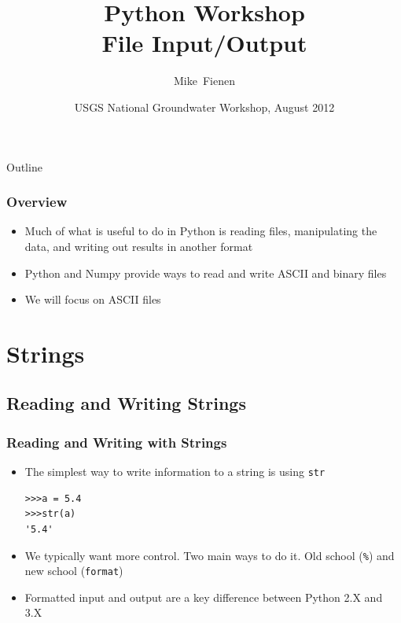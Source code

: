 \documentclass{beamer}
\title[]{Python Workshop\\
File Input/Output}
\author[Fienen] %
{Mike~Fienen}
\institute[USGS] %
{
  U.S. Geological Survey\\
  Wisconsin Water Science Center, Middleton, Wisconsin USA
  }
\date[UQ12] %
{USGS National Groundwater Workshop, August 2012}
\begin{document}
\begin{frame}
  \titlepage
\end{frame}

\begin{frame}{Outline}
\tableofcontents
\end{frame}

\begin{frame}[fragile]
\frametitle{Overview}
\begin{itemize}

\item Much of what is useful to do in Python is reading files, manipulating the data, and writing out results in another format
\item Python and Numpy provide ways to read and write ASCII and binary files
\item We will focus on ASCII files
\end{itemize}
\end{frame}

\section{Strings}
\subsection{Reading and Writing Strings}

\begin{frame}[fragile]
\frametitle{Reading and Writing with Strings}
\begin{itemize}
\item The simplest way to write information to a string is using \texttt{str}
\begin{lstlisting}
>>>a = 5.4
>>>str(a)
'5.4'
\end{lstlisting}
\item We typically want more control. Two main ways to do it. Old school (\texttt{\%}) and new school (\texttt{format})
\item Formatted input and output are a key difference between Python 2.X and 3.X

\end{itemize}
\end{frame}
\end{document}
